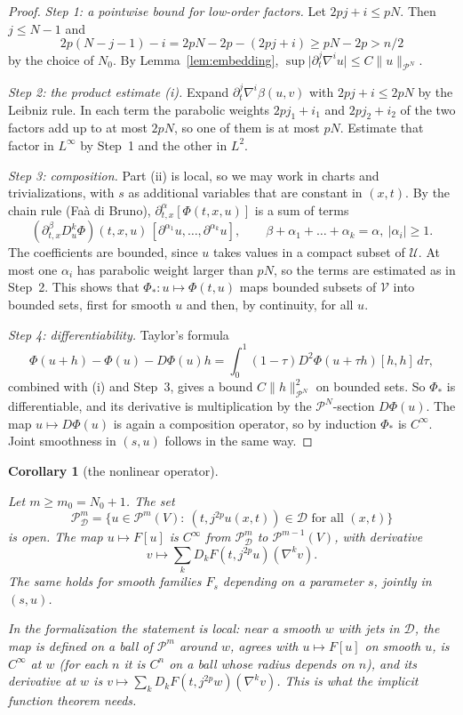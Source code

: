 \documentclass[11pt,reqno]{amsart}
\newtheorem{corollary}[theorem]{Corollary}
\theoremstyle{definition}
\theoremstyle{remark}
\newcommand{\Pp}{\mathcal{P}}
\newcommand{\Dom}{\mathcal{D}}
\newcommand{\norm}[1]{\lVert #1\rVert}
\newcommand{\abs}[1]{\lvert #1\rvert}
\newcommand{\lean}[1]{}
\newcommand{\uses}[1]{}
\numberwithin{equation}{section}
\begin{document}
\begin{proof}
\emph{Step 1: a pointwise bound for low-order factors.} Let $2pj+i\le pN$. Then $j\le N-1$ and
\[
  2p(N-j-1)-i=2pN-2p-(2pj+i)\ge pN-2p>n/2
\]
by the choice of $N_0$. By Lemma~\ref{lem:embedding}, $\sup\abs{\partial_t^j\nabla^iu}\le C\norm u_{\Pp^N}$.

\emph{Step 2: the product estimate (i).} Expand $\partial_t^j\nabla^i\beta(u,v)$ with $2pj+i\le2pN$ by
the Leibniz rule. In each term the parabolic weights $2pj_1+i_1$ and $2pj_2+i_2$ of the two factors add
up to at most $2pN$, so one of them is at most $pN$. Estimate that factor in $L^\infty$ by Step~1 and
the other in $L^2$.

\emph{Step 3: composition.} Part (ii) is local, so we may work in charts and trivializations, with $s$
as additional variables that are constant in $(x,t)$. By the chain rule (Fa\`a di Bruno),
$\partial^\alpha_{t,x}[\Phi(t,x,u)]$ is a sum of terms
\[
  (\partial^\beta_{t,x}D^k_u\Phi)(t,x,u)\,[\partial^{\alpha_1}u,\dots,\partial^{\alpha_k}u],\qquad
  \beta+\alpha_1+\dots+\alpha_k=\alpha,\ \abs{\alpha_i}\ge1.
\]
The coefficients are bounded, since $u$ takes values in a compact subset of $\mathcal U$. At most one
$\alpha_i$ has parabolic weight larger than $pN$, so the terms are estimated as in Step~2. This shows
that $\Phi_*\colon u\mapsto\Phi(t,u)$ maps bounded subsets of $\mathcal V$ into bounded sets, first for
smooth $u$ and then, by continuity, for all $u$.

\emph{Step 4: differentiability.} Taylor's formula
\[
  \Phi(u+h)-\Phi(u)-D\Phi(u)h=\int_0^1(1-\tau)D^2\Phi(u+\tau h)[h,h]\,d\tau,
\]
combined with (i) and Step~3, gives a bound $C\norm h_{\Pp^N}^2$ on bounded sets. So $\Phi_*$ is
differentiable, and its derivative is multiplication by the $\Pp^N$-section $D\Phi(u)$. The map
$u\mapsto D\Phi(u)$ is again a composition operator, so by induction $\Phi_*$ is $C^\infty$. Joint
smoothness in $(s,u)$ follows in the same way.
\end{proof}

\begin{corollary}[the nonlinear operator]\label{cor:N}
\lean{ShortTime.EquationData.exists_nonlinOp, ShortTime.EquationData.exists_nonlinOp_aux, ShortTime.EquationData.exists_dom_tube, ShortTime.FibreMap.exists_nonlinOp_param, ShortTime.FibreMap.paramLift, ShortTime.FibreMap.exists_nonlinOp_param_ball}
\uses{def:data, def:linearization, def:parabolic}
Let $m\ge m_0=N_0+1$. The set
\[
  \Pp^m_\Dom=\{u\in\Pp^m(V):\ (t,j^{2p}u(x,t))\in\Dom\text{ for all }(x,t)\}
\]
is open. The map $u\mapsto F[u]$ is $C^\infty$ from $\Pp^m_\Dom$ to $\Pp^{m-1}(V)$, with derivative
\[
  v\mapsto\sum_kD_kF(t,j^{2p}u)(\nabla^kv).
\]
The same holds for smooth families $F_s$ depending on a parameter $s$, jointly in $(s,u)$.

In the formalization the statement is local: near a smooth $w$ with jets in $\Dom$, the map is
defined on a ball of $\Pp^m$ around $w$, agrees with $u\mapsto F[u]$ on smooth $u$, is $C^\infty$ at
$w$ (for each $n$ it is $C^n$ on a ball whose radius depends on $n$), and its derivative at $w$ is
$v\mapsto\sum_kD_kF(t,j^{2p}w)(\nabla^kv)$. This is what the implicit function
theorem needs.
\end{corollary}
\end{document}
